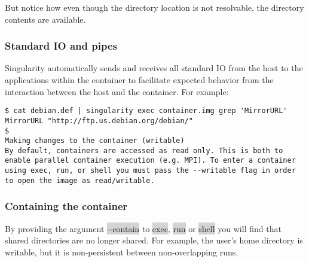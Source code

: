 \documentclass[a4paper]{article}
\begin{document}
But notice how even though the directory location is not resolvable, the directory contents are available.



\subsubsection{Standard IO and pipes}

Singularity automatically sends and receives all standard IO from the host to the applications within the container to facilitate expected behavior from the interaction between the host and the container. For example:
\begin{lstlisting}[frame=single]
$ cat debian.def | singularity exec container.img grep 'MirrorURL'
MirrorURL "http://ftp.us.debian.org/debian/"
$ 
Making changes to the container (writable)
By default, containers are accessed as read only. This is both to enable parallel container execution (e.g. MPI). To enter a container using exec, run, or shell you must pass the --writable flag in order to open the image as read/writable.

\end{lstlisting}

\subsubsection{Containing the container}

By providing the argument \colorbox{lightgray}{-{}-contain} to \colorbox{lightgray}{exec}, \colorbox{lightgray}{run} or \colorbox{lightgray}{shell} you will find that shared directories are no longer shared. For example, the user’s home directory is writable, but it is non-persistent between non-overlapping runs.
\end{document}
